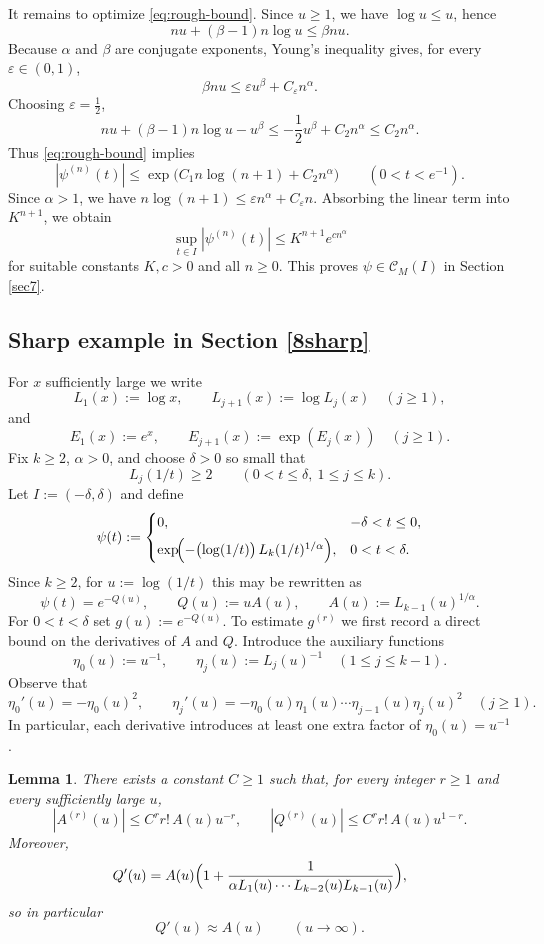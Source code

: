 \documentclass[11pt]{amsart}
\newtheorem{lemma}[theorem]{Lemma}
\newcommand{\1}{{\rm 1\hspace*{-0.4ex}%
			\rule{0.1ex}{1.52ex}\hspace*{0.2ex}}}
\numberwithin{equation}{section}
\begin{document}
It remains to optimize \eqref{eq:rough-bound}. Since $u\ge 1$, we have $\log u\le u$, hence
\[
nu+(\beta-1)n\log u \le \beta n u.
\]
Because $\alpha$ and $\beta$ are conjugate exponents,
Young's inequality gives, for every $\varepsilon\in(0,1)$,
\[
\beta n u \le \varepsilon u^\beta + C_\varepsilon n^\alpha.
\]
Choosing $\varepsilon=\frac12$,
\[
nu+(\beta-1)n\log u-u^\beta \le -\frac12 u^\beta + C_2 n^\alpha \le C_2 n^\alpha.
\]
Thus \eqref{eq:rough-bound} implies
\[
|\psi^{(n)}(t)|
\le
\exp\!\bigl(C_1 n\log(n+1)+C_2 n^\alpha\bigr)
\qquad (0<t<e^{-1}).
\]
Since $\alpha>1$, we have $n\log(n+1)\le \varepsilon n^\alpha + C_\varepsilon n$.
Absorbing the linear term into $K^{n+1}$, we obtain
\[
\sup_{t\in I}|\psi^{(n)}(t)|\le K^{n+1}e^{c n^\alpha}
\]
for suitable constants $K,c>0$ and all $n\ge 0$. This proves $\psi\in \mathcal{C}_M(I)$ in Section \ref{sec7}.


\subsection{Sharp example in Section \ref{8sharp}}\label{sec9.3}
For $x$ sufficiently large we write
\[
L_1(x):=\log x,
\qquad
L_{j+1}(x):=\log L_j(x)\quad (j\ge 1),
\]
and
\[
E_1(x):=e^x,
\qquad
E_{j+1}(x):=\exp(E_j(x))\quad (j\ge 1).
\]
Fix $k\ge 2$, $\alpha>0$, and choose $\delta>0$ so small that
\[
L_j(1/t)\ge 2
\qquad (0<t\le \delta,\ 1\le j\le k).
\]
Let $I:=(-\delta,\delta)$ and define
\[
\psi(t):=
\begin{cases}
	0, & -\delta<t\le 0,\\[4pt]
	\exp\!\Bigl(-\bigl(\log(1/t)\bigr)\,L_k(1/t)^{1/\alpha}\Bigr), & 0<t<\delta.
\end{cases}
\]
Since $k\ge 2$, for $u:=\log(1/t)$ this may be rewritten as
\[
\psi(t)=e^{-Q(u)},
\qquad
Q(u):=uA(u),
\qquad
A(u):=L_{k-1}(u)^{1/\alpha}.
\]
For $0<t<\delta$ set $g(u):=e^{-Q(u)}$.
To estimate $g^{(r)}$ we first record a direct bound on the derivatives of $A$ and $Q$.
Introduce the auxiliary functions
\[
\eta_0(u):=u^{-1},
\qquad
\eta_j(u):=L_j(u)^{-1}\quad (1\le j\le k-1).
\]
Observe that
\[
\eta_0'(u)=-\eta_0(u)^2,
\qquad
\eta_j'(u)=-\eta_0(u)\eta_1(u)\cdots \eta_{j-1}(u)\eta_j(u)^2
\quad (j\ge 1).
\]
In particular, each derivative introduces at least one extra factor of $\eta_0(u)=u^{-1}$.

\begin{lemma}
	\label{lem:AQ}
	There exists a constant $C\ge 1$ such that, for every integer $r\ge 1$ and every sufficiently large $u$,
	\[
	|A^{(r)}(u)|\le C^r r!\,A(u)u^{-r},
	\qquad
	|Q^{(r)}(u)|\le C^r r!\,A(u)u^{1-r}.
	\]
	Moreover,
	\[
	Q'(u)=A(u)\Bigl(1+\frac{1}{\alpha L_1(u)\cdots L_{k-2}(u)L_{k-1}(u)}\Bigr),
	\]
	so in particular
	\[
	Q'(u)\approx A(u)
	\qquad (u\to\infty).
	\]
\end{lemma}
\end{document}

